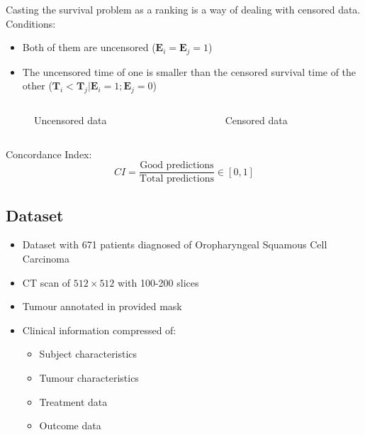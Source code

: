 \begin{frame}

  Casting the survival problem as a ranking is a way of dealing with censored data.
  Conditions:
  \begin{itemize}
    \item Both of them are uncensored (\( \bm{E}_i = \bm{E}_j = 1\))
    \item The uncensored time of one is smaller than the censored survival time of the other
    (\( \bm{T}_i < \bm{T}_j | \bm{E}_i = 1; \bm{E}_j = 0 \))
  \end{itemize}

  \begin{columns}
    \begin{column}{.5\textwidth}
      \begin{figure}
        \centering
        \scalebox{.8}{}
        \caption{Uncensored data}
      \end{figure}
    \end{column}
    \begin{column}{.5\textwidth}
      \begin{figure}
        \centering
        \scalebox{.8}{}
        \caption{Censored data}
      \end{figure}
    \end{column}
  \end{columns}
\end{frame}

\begin{frame}
  Concordance Index:
  \[
    CI = \frac{\text{Good predictions}}{\text{Total predictions}} \in [0, 1]
  \]
\end{frame}

\subsection{Dataset}
\begin{frame}{\insertsubsec}
  \begin{itemize}
    \item Dataset with 671 patients diagnosed of Oropharyngeal Squamous Cell Carcinoma
    \item CT scan of \( 512 \times 512 \) with 100-200 slices
    \item Tumour annotated in provided mask
    \item Clinical information compressed of:
    \begin{itemize}
      \item Subject characteristics
      \item Tumour characteristics
      \item Treatment data
      \item Outcome data
    \end{itemize}
  \end{itemize}
\end{frame}

